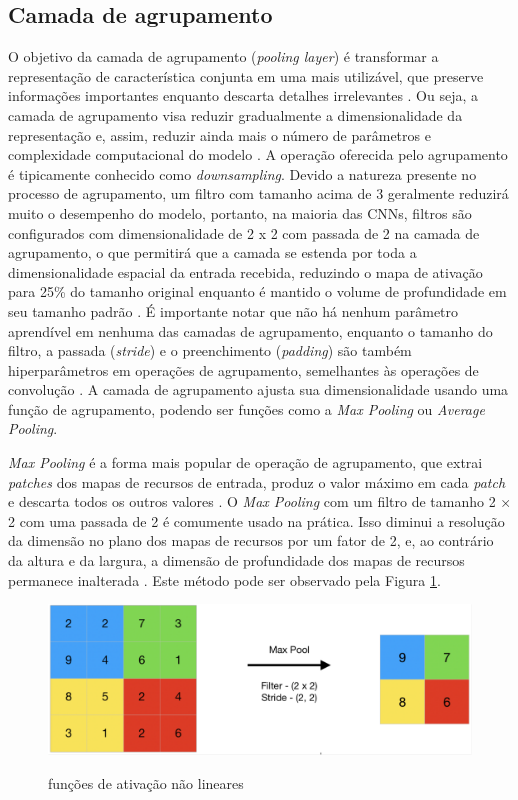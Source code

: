 \documentclass[
	12pt,				%
	oneside,			%
	a4paper,			%
	english,			%
	brazil				%
	]{abntex2ppgsi}
\begin{document}
\subsection{Camada de agrupamento}
O objetivo da camada de agrupamento (\textit{pooling layer}) é transformar a representação de característica conjunta em uma mais utilizável, que preserve informações importantes enquanto descarta detalhes irrelevantes \cite{yu2014mixed}. Ou seja, a camada de agrupamento visa reduzir gradualmente a dimensionalidade da representação e, assim, reduzir ainda mais o número de parâmetros e complexidade computacional do modelo \cite{o2015introduction}. A operação oferecida pelo agrupamento é tipicamente conhecido como \textit{downsampling}. Devido a natureza presente no processo de agrupamento, um filtro com tamanho acima de 3 geralmente reduzirá muito o desempenho do modelo, portanto, na maioria das CNNs, filtros são configurados com dimensionalidade de 2 x 2 com passada de 2 na camada de agrupamento, o que permitirá que a camada se estenda por toda a dimensionalidade espacial da entrada recebida, reduzindo o mapa de ativação para 25\% do tamanho original enquanto é mantido o volume de profundidade em seu tamanho padrão \cite{yamashita2018convolutional}. É importante notar que não há nenhum parâmetro aprendível em nenhuma das camadas de agrupamento, enquanto o tamanho do filtro, a passada (\textit{stride}) e o preenchimento (\textit{padding}) são também hiperparâmetros em operações de agrupamento, semelhantes às operações de convolução \cite{yamashita2018convolutional}. A camada de agrupamento ajusta sua dimensionalidade usando uma função de agrupamento, podendo ser funções como a \textit{Max Pooling} ou \textit{Average Pooling}.

\textit{Max Pooling} é a forma mais popular de operação de agrupamento, que extrai \textit{patches} dos mapas de recursos de entrada, produz o valor máximo em cada \textit{patch} e descarta todos os outros valores \cite{yamashita2018convolutional}. O \textit{Max Pooling} com um filtro de tamanho 2 × 2 com uma passada de 2 é comumente usado na prática. Isso diminui a resolução da dimensão no plano dos mapas de recursos por um fator de 2, e, ao contrário da altura e da largura, a dimensão de profundidade dos mapas de recursos permanece inalterada \cite{yamashita2018convolutional}. Este método pode ser observado pela Figura \ref{fig:max_pooling}.

\begin{figure}[H]
    \centering
    \caption{funções de ativação não lineares}
    \includegraphics[scale=.45]{imagens/conceitos_basicos/max_pooling.png}
    \label{fig:max_pooling}
\end{figure}
\end{document}
